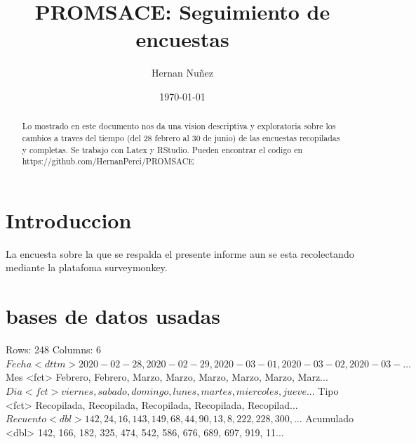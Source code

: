\documentclass{article}
\begin{document}

\title{PROMSACE: Seguimiento de encuestas}
\author{Hernan Nuñez}
\date{\today}
\maketitle
\begin{abstract}
Lo mostrado en este documento nos da una vision descriptiva y exploratoria sobre los cambios a traves del tiempo (del 28 febrero al 30 de junio) de las encuestas recopiladas y completas. Se trabajo con Latex y RStudio. Pueden encontrar el codigo en https://github.com/HernanPerci/PROMSACE
\end{abstract}

\tableofcontents

\section{Introduccion}
La encuesta sobre la que se respalda el presente informe aun se esta recolectando mediante la platafoma surveymonkey.

\section{bases de datos usadas}
\begin{Schunk}
\begin{Soutput}
Rows: 248
Columns: 6
$ Fecha     <dttm> 2020-02-28, 2020-02-29, 2020-03-01, 2020-03-02, 2020-03-...
$ Mes       <fct> Febrero, Febrero, Marzo, Marzo, Marzo, Marzo, Marzo, Marz...
$ Dia       <fct> viernes, sabado, domingo, lunes, martes, miercoles, jueve...
$ Tipo      <fct> Recopilada, Recopilada, Recopilada, Recopilada, Recopilad...
$ Recuento  <dbl> 142, 24, 16, 143, 149, 68, 44, 90, 13, 8, 222, 228, 300, ...
$ Acumulado <dbl> 142, 166, 182, 325, 474, 542, 586, 676, 689, 697, 919, 11...
\end{Soutput}
\end{Schunk}
\begin{Schunk}
\end{Schunk}
\end{document}
